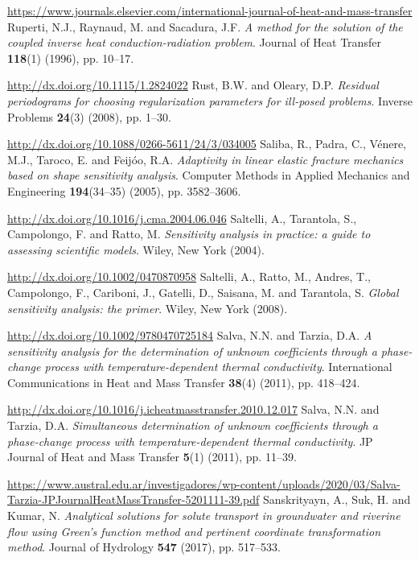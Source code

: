 \begin{thebibliography}{301}
\href{https://www.journals.elsevier.com/international-journal-of-heat-and-mass-transfer}{https://www.journals.elsevier.com/international-journal-of-heat-and-mass-transfer}
%
%
 Ruperti, N.J., Raynaud, M. and Sacadura, J.F. {\it A method for the solution of the coupled inverse heat conduction-radiation problem}. Journal of Heat Transfer {\bf 118}(1) (1996), pp. 10--17.

\url{http://dx.doi.org/10.1115/1.2824022}
%
%
 Rust, B.W. and O\textquotesingle leary, D.P. {\it Residual periodograms for choosing regularization parameters for ill-posed problems}. Inverse Problems {\bf 24}(3) (2008), pp. 1--30.

\url{http://dx.doi.org/10.1088/0266-5611/24/3/034005}
%
%
 Saliba, R., Padra, C., V\'enere, M.J., Taroco, E. and Feij\'oo, R.A. {\it Adaptivity in linear elastic fracture mechanics based on shape sensitivity analysis}. Computer Methods in Applied Mechanics and Engineering {\bf 194}(34--35) (2005), pp. 3582--3606.

\url{http://dx.doi.org/10.1016/j.cma.2004.06.046}
%
%
 Saltelli, A., Tarantola, S., Campolongo, F. and Ratto, M. {\it Sensitivity analysis in practice: a guide to assessing scientific models}. Wiley, New York (2004).

\url{http://dx.doi.org/10.1002/0470870958}
%
%
 Saltelli, A., Ratto, M., Andres, T., Campolongo, F., Cariboni, J., Gatelli, D., Saisana, M. and Tarantola, S. {\it Global sensitivity analysis: the primer}. Wiley, New York (2008).

\url{http://dx.doi.org/10.1002/9780470725184}
%
%
 Salva, N.N. and Tarzia, D.A. {\it A sensitivity analysis for the determination of unknown coefficients through a phase-change process with temperature-dependent thermal conductivity}. International Communications in Heat and Mass Transfer {\bf 38}(4) (2011), pp. 418--424.

\url{http://dx.doi.org/10.1016/j.icheatmasstransfer.2010.12.017}
%
%
 Salva, N.N. and Tarzia, D.A. {\it Simultaneous determination of unknown coefficients through a phase-change process with temperature-dependent thermal conductivity}. JP Journal of Heat and Mass Transfer {\bf 5}(1) (2011), pp. 11--39.

\url{https://www.austral.edu.ar/investigadores/wp-content/uploads/2020/03/Salva-Tarzia-JPJournalHeatMassTransfer-5201111-39.pdf}
%
%
 Sanskrityayn, A., Suk, H. and Kumar, N. {\it Analytical solutions for solute transport in groundwater and riverine flow using Green’s function method and pertinent coordinate transformation method}. Journal of Hydrology {\bf 547} (2017), pp. 517--533.


\end{thebibliography}
